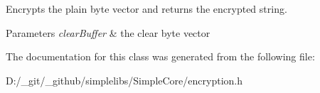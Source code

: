 Encrypts the plain byte vector and returns the encrypted string. 


\begin{DoxyParams}{Parameters}
{\em clear\+Buffer} & the clear byte vector \\
\hline
\end{DoxyParams}


The documentation for this class was generated from the following file\+:\begin{DoxyCompactItemize}
\item 
D\+:/\+\_\+git/\+\_\+github/simplelibs/\+Simple\+Core/encryption.\+h\end{DoxyCompactItemize}

